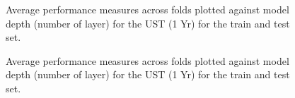 \begin{figure}


\caption{\label{fig-ust-1y}Average performance measures across folds plotted against model depth (number of layer) for the UST (1 Yr) for the train and test set.}

\end{figure}%


\begin{figure}


\caption{\label{fig-ust-10}Average performance measures across folds plotted against model depth (number of layer) for the UST (1 Yr) for the train and test set.}

\end{figure}%


